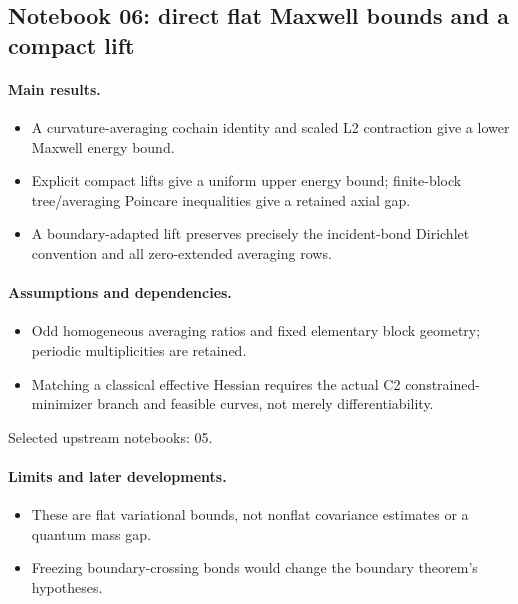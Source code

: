 \documentclass[11pt]{article}
\theoremstyle{remark}
\begin{document}
\subsection{Notebook 06: direct flat Maxwell bounds and a compact lift}
\label{hnc-06}
\noindent{}\par

\paragraph{Main results.}
\begin{itemize}
\item A curvature-averaging cochain identity and scaled L2 contraction give a lower Maxwell energy bound.
\item Explicit compact lifts give a uniform upper energy bound; finite-block tree/averaging Poincare inequalities give a retained axial gap.
\item A boundary-adapted lift preserves precisely the incident-bond Dirichlet convention and all zero-extended averaging rows.
\end{itemize}

\paragraph{Assumptions and dependencies.}
\begin{itemize}
\item Odd homogeneous averaging ratios and fixed elementary block geometry; periodic multiplicities are retained.
\item Matching a classical effective Hessian requires the actual C2 constrained-minimizer branch and feasible curves, not merely differentiability.
\end{itemize}

Selected upstream notebooks: 05.\par

\paragraph{Limits and later developments.}
\begin{itemize}
\item These are flat variational bounds, not nonflat covariance estimates or a quantum mass gap.
\item Freezing boundary-crossing bonds would change the boundary theorem's hypotheses.
\end{itemize}
\end{document}
